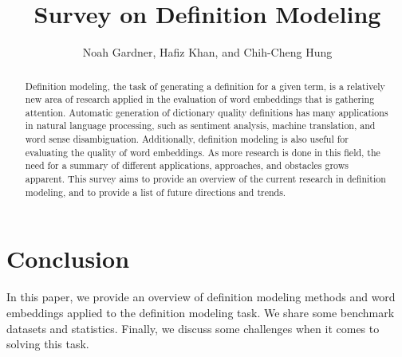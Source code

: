 \documentclass{aims}
\numberwithin{equation}{section}
\begin{document}
\title{Survey on Definition Modeling}

\author{%
    Noah Gardner,
    Hafiz Khan,
    and Chih-Cheng Hung\corrauth
}%


\address{%
    }

\begin{abstract}
    Definition modeling, the task of generating a definition for a given term,
    is a relatively new area of research applied in the evaluation of word
    embeddings that is gathering attention. Automatic generation of dictionary
    quality definitions has many applications in natural language processing,
    such as sentiment analysis, machine translation, and word sense
    disambiguation. Additionally, definition modeling is also useful for
    evaluating the quality of word embeddings. As more research is done in this
    field, the need for a summary of different applications, approaches, and
    obstacles grows apparent. This survey aims to provide an overview of the
    current research in definition modeling, and to provide a list of future
    directions and trends.
\end{abstract}
\maketitle




\FloatBarrier


\FloatBarrier
\section{Conclusion}
In this paper, we provide an overview of definition modeling methods 
and word embeddings applied to the definition modeling task. We share
some benchmark datasets and statistics. Finally, we discuss some challenges
when it comes to solving this task. 



\end{document}
